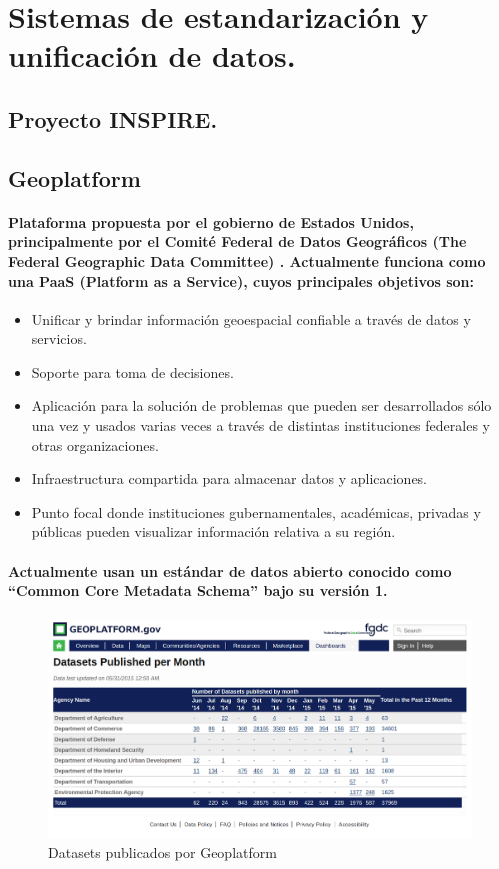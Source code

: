 \section{Sistemas de estandarización y unificación de datos.}
  \subsection{Proyecto INSPIRE.}
    \paragraph{}
  \subsection{Geoplatform}
    \paragraph{Plataforma propuesta por el gobierno de Estados Unidos, principalmente por el Comité Federal de Datos Geográficos (The Federal Geographic Data Committee) \cite{19}. Actualmente funciona como una PaaS (Platform as a Service), cuyos principales objetivos son:}
    \begin{itemize}
      \item {Unificar y brindar información geoespacial confiable a través de datos y servicios.}
      \item {Soporte para toma de decisiones.}
      \item{Aplicación para la solución de problemas que pueden ser desarrollados sólo una vez y usados varias veces a través de distintas instituciones federales y otras organizaciones.}
      \item{Infraestructura compartida para almacenar datos y aplicaciones.}
      \item{Punto focal donde instituciones gubernamentales, académicas, privadas y públicas pueden visualizar información relativa a su región.}
  \end{itemize}
  \paragraph{Actualmente usan un estándar de datos abierto conocido como “Common Core Metadata Schema” bajo su versión 1. \cite{20}}

  \begin{figure}[h!]
        \centering
          \includegraphics[width=\textwidth]{./images/GeoPlatform.png}
        \caption{Datasets publicados por Geoplatform}
    \end{figure}    

